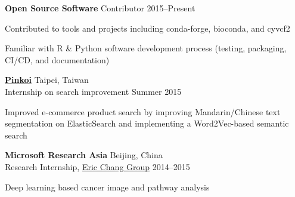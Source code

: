 \begin{entrylist}
\item \textbf{Open Source Software}
Contributor \hfill 2015--Present
\begin{detaillist}
    \item Contributed to tools and projects including conda-forge, bioconda, and cyvcf2
    \item Familiar with R \& Python software development process (testing, packaging, CI/CD, and documentation)
\end{detaillist}

\item \href{http://pinkoi.com}{\textbf{Pinkoi}} \hfill Taipei, Taiwan\\
Internship on search improvement \hfill
Summer 2015
\begin{detaillist}
    \item Improved e-commerce product search by improving Mandarin/Chinese text segmentation on ElasticSearch and implementing a Word2Vec-based semantic search
\end{detaillist}

\item \textbf{Microsoft Research Asia} \hfill Beijing, China\\
Research Internship, \href{https://www.microsoft.com/en-us/research/people/echang/}{Eric Chang Group} \hfill
2014--2015
\begin{detaillist}
    \item Deep learning based cancer image and pathway analysis
\end{detaillist}


\end{entrylist}
